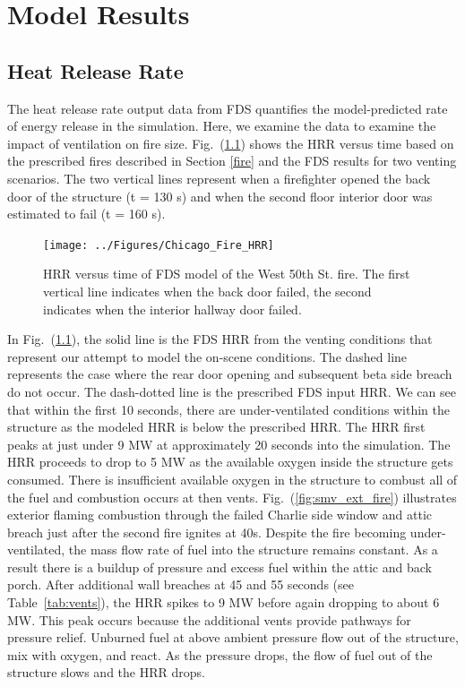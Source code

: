 \documentclass[11pt,oneside]{book}
\begin{document}
\chapter{Model Results}

\section{Heat Release Rate}
\label{HRR}
The heat release rate output data from FDS quantifies the model-predicted rate of energy release in the simulation. Here, we examine the data to examine the impact of ventilation on fire size. Fig.~(\ref{fig:hrr}) shows the HRR versus time based on the prescribed fires described in Section \ref{fire} and the FDS results for two venting scenarios. The two vertical lines represent when a firefighter opened the back door of the structure (t = 130 s) and when the second floor interior door was estimated to fail (t = 160 s).

\begin{figure}[h!]
\centering
\texttt{[image: ../Figures/Chicago\_Fire\_HRR]}
\caption{HRR versus time of FDS model of the West 50th St. fire. The first vertical line indicates when the back door failed, the second indicates when the interior hallway door failed.}
\label{fig:hrr}
\end{figure}

In Fig.~(\ref{fig:hrr}), the solid line is the FDS HRR from the venting conditions that represent our attempt to model the on-scene conditions. The dashed line represents the case where the rear door opening and subsequent beta side breach do not occur. The dash-dotted line is the prescribed FDS input HRR. We can see that within the first 10 seconds, there are under-ventilated conditions within the structure as the modeled HRR is below the prescribed HRR. The HRR first peaks at just under 9 MW at approximately 20 seconds into the simulation. The HRR proceeds to drop to 5 MW as the available oxygen inside the structure gets consumed. There is insufficient available oxygen in the structure to combust all of the fuel and combustion occurs at then vents. Fig.~(\ref{fig:smv_ext_fire}) illustrates exterior flaming combustion through the failed Charlie side window and attic breach just after the second fire ignites at 40s. Despite the fire becoming under-ventilated, the mass flow rate of fuel into the structure remains constant. As a result there is a buildup of pressure and excess fuel within the attic and back porch. After additional wall breaches at 45 and 55 seconds (see Table~\ref{tab:vents}), the HRR spikes to 9 MW before again dropping to about 6 MW. This peak occurs because the additional vents provide pathways for pressure relief. Unburned fuel at above ambient pressure flow out of the structure, mix with oxygen, and react. As the pressure drops, the flow of fuel out of the structure slows and the HRR drops.
\end{document}
